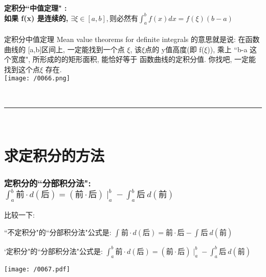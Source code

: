 \documentclass[UTF8]{ctexart}
\begin{document}
	
	
	\subsection{定积分``中值定理" : \\
		如果 f(x) 是连续的, $ \exists \xi  \in [a,b], \text{则必然有}\int_a^b{f(x)dx=f(\xi)(b-a)}$}
	
	定积分中值定理 Mean value theorems for definite integrals 的意思就是说: 在函数曲线的 [a,b]区间上, 一定能找到一个点 $\xi$, 该$\xi$点的 y值高度(即 f($\xi$)), 乘上 ``b-a 这个宽度", 所形成的的矩形面积, 能恰好等于 函数曲线的定积分值.  你找吧, 一定能找到这个点$\xi$ 存在. \\
	
	\texttt{[image: /0066.png]}
	
	
	~\\
	\hrule
	~\\
	
	\part{求定积分的方法}
	
	
	\section{定积分的``分部积分法": $\int_a^b{\text{前}\cdot d(\text{后})}=\left( \text{前}\cdot \text{后} \right) \mid_{a}^{b}-\int_a^b{\text{后}}\ d(\text{前})$}
	
	比较一下: 
	
	``不定积分"的``分部积分法"公式是: $\boxed{\int_{}^{}{\text{前}\cdot d(\text{后})}=\text{前}\cdot \text{后}-\int_{}^{}{\text{后}}\ d(\text{前})}	$
	
	`定积分"的``分部积分法"公式是: $\boxed{\int_a^b{\text{前}\cdot d(\text{后})}=\left( \text{前}\cdot \text{后} \right) \mid_{a}^{b}-\int_a^b{\text{后}}\ d(\text{前})}	$
	
	\begin{myEnvSample}
	\texttt{[image: /0067.pdf]}
	\end{myEnvSample}
	
\end{document}
